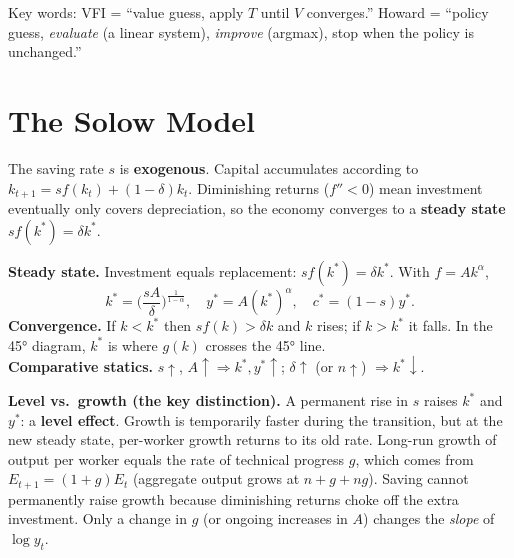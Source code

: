\documentclass[10pt]{article}
\begin{document}
\begin{trap}
\small Key words: VFI = ``value guess, apply $T$ until $V$ converges.'' Howard = ``policy guess, \emph{evaluate} (a linear system), \emph{improve} (argmax), stop when the policy is unchanged.''
\end{trap}

\section{The Solow Model}

\begin{bigidea}
The saving rate $s$ is \textbf{exogenous}. Capital accumulates according to $k_{t+1}=sf(k_t)+(1-\delta)k_t$. Diminishing returns ($f''<0$) mean investment eventually only covers depreciation, so the economy converges to a \textbf{steady state} $sf(k^*)=\delta k^*$.
\end{bigidea}

\begin{minipage}{0.52\textwidth}
\textbf{Steady state.} Investment equals replacement: $sf(k^*)=\delta k^*$. With $f=Ak^\alpha$,
\[k^*=\Big(\frac{sA}{\delta}\Big)^{\frac1{1-\alpha}},\quad y^*=A(k^*)^\alpha,\quad c^*=(1-s)y^*.\]
\textbf{Convergence.} If $k<k^*$ then $sf(k)>\delta k$ and $k$ rises; if $k>k^*$ it falls. In the 45° diagram, $k^*$ is where $g(k)$ crosses the 45° line.\\
\textbf{Comparative statics.} $s\uparrow$, $A\uparrow\Rightarrow k^*,y^*\uparrow$; $\delta\uparrow$ (or $n\uparrow$) $\Rightarrow k^*\downarrow$.
\end{minipage}\hfill
\begin{minipage}{0.45\textwidth}\centering
\figSolow
\end{minipage}

\begin{minipage}{0.52\textwidth}
\textbf{Level vs.\ growth (the key distinction).} A permanent rise in $s$ raises $k^*$ and $y^*$: a \textbf{level effect}. Growth is temporarily faster during the transition, but at the new steady state, per-worker growth returns to its old rate. Long-run growth of output per worker equals the rate of technical progress $g$, which comes from $E_{t+1}=(1+g)E_t$ (aggregate output grows at $n+g+ng$). Saving cannot permanently raise growth because diminishing returns choke off the extra investment. Only a change in $g$ (or ongoing increases in $A$) changes the \emph{slope} of $\log y_t$.
\end{minipage}\hfill
\begin{minipage}{0.45\textwidth}\centering
\figLevelGrowth
\end{minipage}
\end{document}
